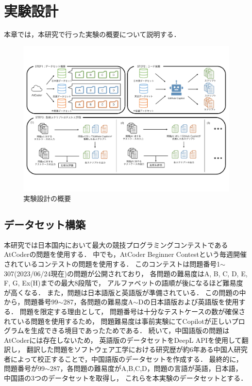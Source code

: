 \section{実験設計\label{approach}}
  本章では，本研究で行った実験の概要について説明する．
  \begin{figure}[t]
    \centering
    \includegraphics[width=\linewidth]{image/system.pdf}
    \caption{実験設計の概要}
    \label{experiment_design}
  \end{figure}
  
  \subsection{データセット構築\label{build_dataset}}
    本研究では日本国内において最大の競技プログラミングコンテストであるAtCoder\cite{AtCoder}の問題を使用する．
    中でも，AtCoder Beginner Contestという毎週開催されているコンテストの問題を使用する．
    このコンテストは問題番号1${\sim}$307(2023/06/24現在)の問題が公開されており，
    各問題の難易度はA, B, C, D, E, F, G, Ex(H)までの最大8段階で，
    アルファベットの語順が後になるほど難易度が高くなる．
    また，問題は日本語版と英語版が準備されている．
    この問題の中から，問題番号99${\sim}$287，各問題の難易度A${\sim}$Dの日本語版および英語版を使用する．
    問題を限定する理由として，
    問題番号は十分なテストケースの数が確保されている問題を使用するため，
    問題難易度は事前実験にてCopilotが正しいプログラムを生成できる境目であったためである．
    続いて，中国語版の問題はAtCoderには存在しないため，
    英語版のデータセットをDeepL APIを使用して翻訳し，
    翻訳した問題をソフトウェア工学における研究歴が約6年ある中国人研究者によって校正することで，中国語版のデータセットを作成する．
    最終的に，問題番号が99${\sim}$287，各問題の難易度がA,B,C,D，問題の言語が英語，日本語，中国語の3つのデータセットを取得し，
    これらを本実験のデータセットとする．

